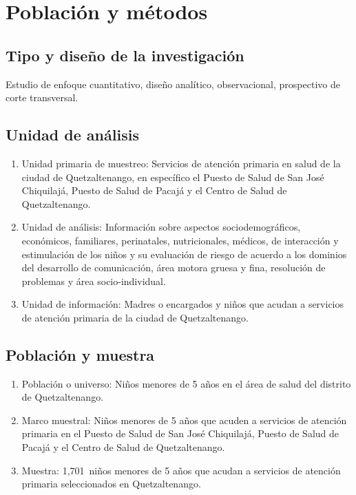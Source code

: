 \documentclass[11pt,letterpaper]{report}
\newcommand{\tiempito}{durante 2,025}
\newcommand{\muestradeseada}{1,701}
\begin{document}
	\chapter{Población y métodos}
\section{Tipo y diseño de la investigación}
Estudio de enfoque cuantitativo, diseño analítico, observacional, prospectivo
de corte transversal.

\section{Unidad de análisis}
	\begin{enumerate}
		\item Unidad primaria de muestreo: Servicios de atención primaria en
		salud de la ciudad de Quetzaltenango, en específico el Puesto de
		Salud de San José Chiquilajá, Puesto de Salud de Pacajá y el Centro de
		Salud de Quetzaltenango.
		\item Unidad de análisis: Información sobre aspectos sociodemográficos,
		económicos, familiares, perinatales, nutricionales, médicos, de
		interacción y estimulación de los niños y su evaluación de riesgo de
		acuerdo a los dominios del desarrollo de comunicación, área motora
		gruesa y fina, resolución de problemas y área socio-individual.
		\item Unidad de información: Madres o encargados y niños que acudan a
		servicios de atención primaria de la ciudad de Quetzaltenango.
	\end{enumerate}

\section{Población y muestra}
	\begin{enumerate}
		\item Población o universo: Niños menores de 5 años en el área de salud
		del distrito de Quetzaltenango.
		\item Marco muestral: Niños menores de 5 años que acuden a servicios de
		atención primaria en el Puesto de Salud de San José Chiquilajá, Puesto
		de Salud de Pacajá y el Centro de Salud de Quetzaltenango. %
		\item Muestra: \muestradeseada\ niños menores de 5 años que acudan a
		servicios de atención primaria seleccionados en Quetzaltenango.
	\end{enumerate}
\end{document}
